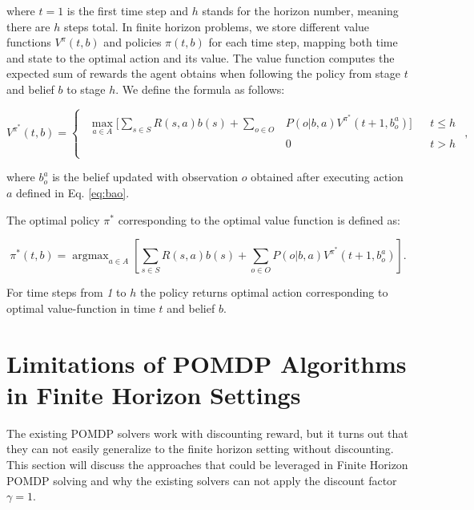 where $t=1$ is the first time step and $h$ stands for the horizon number, meaning there are $h$ steps total.
In finite horizon problems, we store different value functions $V^{\pi}(t, b)$ and policies $\pi(t, b)$ for each time step, mapping both time and state to the optimal action and its value. The value function computes the expected sum of rewards the agent obtains when following the policy from stage $t$ and belief $b$ to stage $h$. We define the formula as follows:


\begin{equation}
    V^{\pi^*}(t, b) = \begin{cases} \begin{aligned}
        \operatorname{max}_{a \in A} \Bigg[ \sum_{s \in S} R(s, a)b(s) + \sum_{o \in O} & P(o|b, a) V^{\pi ^ *}(t+1, b^a_o) \Bigg] && t \leq h \\
        & 0 && t > h \\
        \end{aligned} \end{cases}
    ,
\end{equation}

where $b^a_o$ is the belief updated with observation $o$ obtained after executing action $a$ defined in Eq. \ref{eq:bao}.

The optimal policy ${\pi}^*$ corresponding to the optimal value function is defined as:

\begin{equation}
{\pi}^*(t, b) = \operatorname{argmax}_{a \in A} \left[ {\sum_{s \in S} R(s, a)b(s) + \sum_{o \in O} P(o|b, a) V^{\pi ^ *}(t+1, b^a_o) }\right].
\end{equation} 

For time steps from \textit{1} to $h$ the policy returns optimal action corresponding to optimal value-function in time $t$ and belief $b$. 

\section{Limitations of POMDP Algorithms in Finite Horizon Settings}

The existing POMDP solvers work with discounting reward, but it turns out that they can not easily generalize to the finite horizon setting without discounting. This section will discuss the approaches that could be leveraged in Finite Horizon POMDP solving and why the existing solvers can not apply the discount factor $\gamma = 1$.

